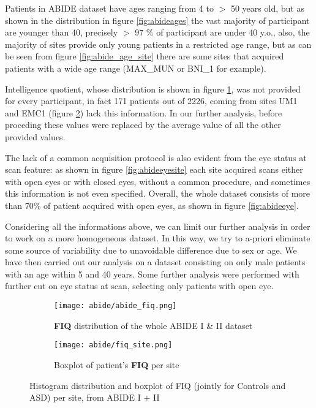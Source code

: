 \documentclass[11pt]{report}
\begin{document}
Patients in ABIDE dataset have ages ranging from 4 to $>$ 50 years old, but as shown in the distribution in figure \ref{fig:abideages} the vast majority of participant are younger than 40, precisely $>$ 97 $\%$ of participant are under 40 y.o., also, the majority of sites provide only young patients in a restricted age range, but  as can be seen from figure \ref{fig:abide_age_site} there are some sites that acquired patients with a wide age range (MAX\_MUN or BNI\_1 for example).


Intelligence quotient, whose distribution is shown in figure \ref{fig:abidefiq}, was not provided for every participant, in fact 171 patients out of 2226, coming from sites UM1 and EMC1 (figure \ref{fig:abide_fiq_site}) lack this information.
In our further analysis, before proceding these values were replaced by the average value of all the other provided values.

The lack of a common acquisition protocol is also evident from the eye status at scan feature: as shown in figure \ref{fig:abideeyesite} each site acquired scans either with open eyes or with closed eyes, without a common procedure, and sometimes this information is not even specified.
Overall, the whole dataset consists of more than 70\% of patient acquired with open eyes, as shown in figure \ref{fig:abideeye}.

Considering all the informations above, we can limit our further analysis in order to work on a more homogeneous dataset. In this way, we try to a-priori eliminate some source of variability due to unavoidable difference due to sex or age.
We have then carried out our analysis on a dataset consisting on only male patients with an age within 5 and 40 years. Some further analysis were performed with further cut on eye status at scan, selecting only patients with open eye.




\begin{figure}
\centering
\begin{subfigure}{0.5\textwidth}
\texttt{[image: abide/abide\_fiq.png]}
\caption{\textbf{FIQ} distribution of the whole ABIDE I \& II dataset}
\label{fig:abidefiq}
\end{subfigure}
\hspace{2cm}
\begin{subfigure}{0.9\textwidth}
\texttt{[image: abide/fiq\_site.png]}
\caption{Boxplot of patient's \textbf{FIQ} per site}
\label{fig:abide_fiq_site}
\end{subfigure}
\caption{Histogram distribution and boxplot of FIQ (jointly for Controls and ASD) per site, from ABIDE I + II}
\label{}
\end{figure}
\end{document}
